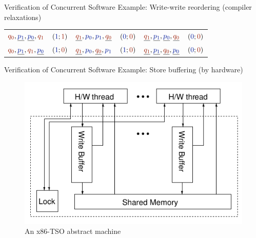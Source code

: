 \documentclass{beamer}
\renewcommand{\r}[1]{\ensuremath{\textcolor{dkred}{#1}}}
\renewcommand{\b}[1]{\ensuremath{\textcolor{dkblue}{#1}}}
\begin{document}
\begin{frame}{Verification of Concurrent Software} {Example: Write-write reordering (compiler  relaxations)}
\begin{minipage}{.6\textwidth}
\begin{table}
\begin{tabular}{ | l r | l r | l r }
$\r{q_0}, \underline{\b{p_1}}, \underline{\b{p_0}}, \r{q_1}$ & $(\b{1}; \r{1})$  &  $\underline{\r{q_1}}, \b{p_0}, \b{p_1}, \underline{\r{q_0}}$ & $(\b{0}; \r{0})$  &  $\underline{\r{q_1}}, \underline{\b{p_1}}, \underline{\b{p_0}}, \underline{\r{q_0}}$ & $(\b{0}; \r{0})$ \\
$\r{q_0}, \underline{\b{p_1}}, \r{q_1}, \underline{\b{p_0}}$ & $(\b{1}; \r{0})$  &  $\underline{\r{q_1}}, \b{p_0}, \underline{\r{q_0}}, \b{p_1}$ & $(\b{1}; \r{0})$  &  $\underline{\r{q_1}}, \underline{\b{p_1}}, \underline{\r{q_0}}, \underline{\b{p_0}}$ & $(\b{0}; \r{0})$ \\
\end{tabular}
\end{table}
\end{minipage}

\end{frame}



\begin{frame}{Verification of Concurrent Software} {Example: Store buffering (by hardware)}
\begin{center}
\end{center}

\begin{figure}
\includegraphics[scale=0.37]{img/x86-arch-full.png}
\caption{An x86-TSO abstract machine~\cite{sewell2010x86}}
\end{figure}
\end{frame}
\end{document}
